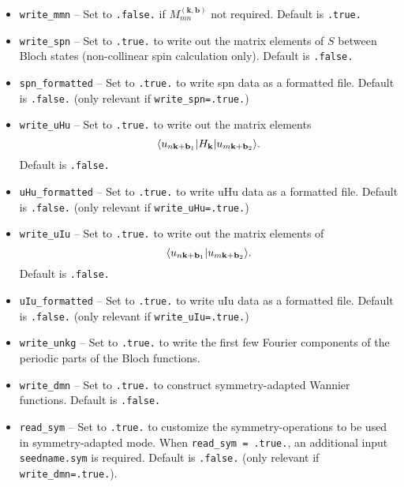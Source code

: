 \begin{itemize}
\item   \verb#write_mmn# -- Set to \verb#.false.# if
   $M_{mn}^{(\mathbf{k,b})}$ not required. Default is \verb#.true.#

\item   \verb#write_spn# -- Set to \verb#.true.# to write out the matrix
   elements of $S$ between Bloch states (non-collinear spin calculation
   only). Default is \verb#.false.#

\item   \verb#spn_formatted# -- Set to \verb#.true.# to write spn data as a formatted file. Default is \verb#.false.# (only relevant if
   \verb#write_spn=.true.#)


\item   \verb#write_uHu# -- Set to \verb#.true.# to write out the matrix
   elements $$\langle u_{n{\bf k}+{\bf b}_1}\vert
H_{\bf k}\vert u_{m{\bf k}+{\bf b}_2}\rangle.
$$
Default is \verb#.false.#

\item   \verb#uHu_formatted# -- Set to \verb#.true.# to write uHu data as a formatted file. Default is \verb#.false.# (only relevant if
   \verb#write_uHu=.true.#)


\item   \verb#write_uIu# -- Set to \verb#.true.# to write out the matrix
   elements of $$\langle  u_{n{\bf k}+{\bf b}_1}\vert
u_{m{\bf k}+{\bf b}_2}\rangle.
$$ Default is \verb#.false.# 

\item   \verb#uIu_formatted# -- Set to \verb#.true.# to write uIu data as a formatted file. Default is \verb#.false.# (only relevant if
   \verb#write_uIu=.true.#)



\item   \verb#write_unkg# -- Set to \verb#.true.# to write the first few
   Fourier components of the periodic parts of the Bloch functions.

\item   \verb#write_dmn# -- Set to \verb#.true.# to construct symmetry-adapted Wannier functions.  
Default is \verb#.false.#

\item   \verb#read_sym# -- Set to \verb#.true.# to customize the symmetry-operations to be used in symmetry-adapted mode. 
When  \verb#read_sym = .true.#, an additional input {\tt seedname.sym} is required. 
Default is \verb#.false.#
(only relevant if \verb#write_dmn=.true.#). 



\end{itemize}

